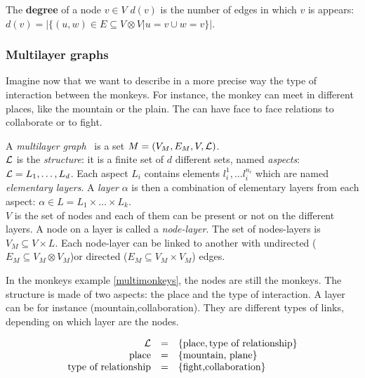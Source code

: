\documentclass{svproc}
\begin{document}
The {\bf degree} of a node $v\in V$ $d(v)$ is the number of edges in which $v$ is appears: $d(v)=|\{(u,w) \in E \subseteq V \otimes V| u=v \cup w=v\}|$.

\subsubsection{Multilayer graphs}
%
Imagine now that we want to describe in a more precise way the type of interaction between the monkeys. For instance, the monkey can meet in different places, like the mountain or the plain. The can have face to face relations to collaborate or to fight.

A {\em multilayer graph}~\cite{mlkiv,mldd} is a set $M=(V_M,E_M,V,{\cal L})$.\\
${\cal L}$ is the {\em structure}: it is a finite set of $d$ different sets, named {\em aspects}: ${\cal L} = L_1, \dots, L_d$. Each aspect $L_i$ contains elements $l_i^1,\dots l_i^{n_i}$ which are named {\em elementary layers}. A {\em layer} $\alpha$ is then a combination of elementary layers from each aspect: $\alpha \in L=L_1\times \dots \times L_k$. \\
$V$ is the set of nodes and each of them can be present or not on the different layers. A node on a layer is called a {\em node-layer}. The set of nodes-layers is $V_M \subseteq V \times L$. Each node-layer can be linked to another with undirected ($E_M\subseteq V_M \otimes V_M$)or directed ($E_M \subseteq V_M \times V_M$) edges.

In the monkeys example \cref{multimonkeys}, the nodes are still the monkeys. The structure is made of two aspects: the place and the type of interaction. A layer can be for instance (mountain,collaboration). They are different types of links, depending on which layer are the nodes.

\begin{equation}
\begin{array}{rcl}
  {\cal L}&=&\{\text{place},\text{type of relationship}\} \\
  \text{place} &=& \{\text{mountain, plane}\}\\
 \text{type of relationship} &=& \{ \text{fight,collaboration}\}
\end{array}
\end{equation}
\end{document}
